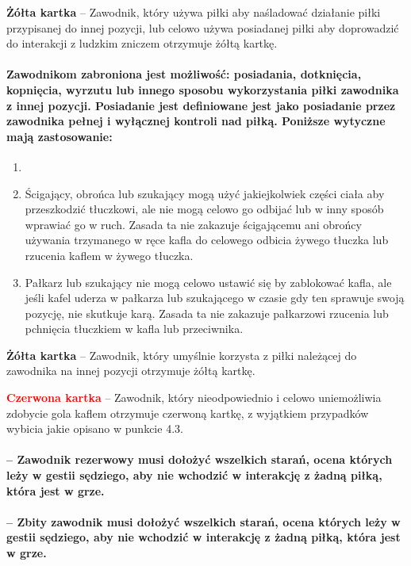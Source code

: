 \documentclass[12pt]{article}
\newcommand\redcard[1]{\bgroup\textcolor{red}{\textbf{#1}}}
\newcommand\yellowcard[1]{\bgroup\textcolor{darkyellow}{\textbf{#1}}}
\begin{document}
\yellowcard{Żółta kartka} -- Zawodnik, który używa piłki aby naśladować
działanie piłki przypisanej do innej pozycji, lub celowo używa
posiadanej piłki aby doprowadzić do interakcji z ludzkim zniczem
otrzymuje żółtą kartkę.

\paragraph{Zawodnikom zabroniona jest możliwość: posiadania,
	dotknięcia, kopnięcia, wyrzutu lub innego sposobu wykorzystania piłki
	zawodnika z innej pozycji. Posiadanie jest definiowane jest jako
	posiadanie przez zawodnika pełnej i wyłącznej kontroli nad piłką.
	Poniższe wytyczne mają zastosowanie:}

\begin{enumerate}
	\item
	\item Ścigający, obrońca lub szukający mogą użyć jakiejkolwiek części
	      ciała aby przeszkodzić tłuczkowi, ale nie mogą celowo go odbijać lub w
	      inny sposób wprawiać go w ruch. Zasada ta nie zakazuje ścigającemu ani
	      obrońcy używania trzymanego w ręce kafla do celowego odbicia żywego
	      tłuczka lub rzucenia kaflem w żywego tłuczka.
	\item
	      Pałkarz lub szukający nie mogą celowo ustawić się by zablokować kafla,
	      ale jeśli kafel uderza w pałkarza lub szukającego w czasie gdy ten
	      sprawuje swoją pozycję, nie skutkuje karą. Zasada ta nie zakazuje
	      pałkarzowi rzucenia lub pchnięcia tłuczkiem w kafla lub przeciwnika.
\end{enumerate}

\yellowcard{Żółta kartka} -- Zawodnik, który umyślnie korzysta z piłki należącej
do zawodnika na innej pozycji otrzymuje żółtą kartkę.

\redcard{Czerwona kartka} -- Zawodnik, który nieodpowiednio i celowo
uniemożliwia zdobycie gola kaflem otrzymuje czerwoną kartkę, z wyjątkiem
przypadków wybicia jakie opisano w punkcie 4.3.

\paragraph{-- Zawodnik rezerwowy musi dołożyć wszelkich starań,
	ocena których leży w gestii sędziego, aby nie wchodzić w interakcję z
	żadną piłką, która jest w grze.}

\paragraph{-- Zbity zawodnik musi dołożyć wszelkich starań, ocena
	których leży w gestii sędziego, aby nie wchodzić w interakcję z żadną
	piłką, która jest w grze.}
\end{document}
